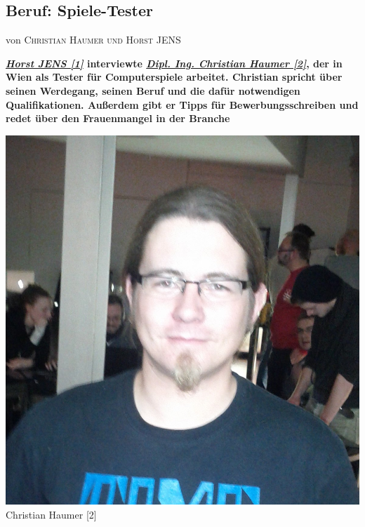 \documentclass[10pt,a4paper,ngerman,twoside]{article} %
\newcommand{\NewsItem}[1]{ %
\usefont{T1}{fvs}{n}{n} %
\vspace{24pt}\large #1\vspace{3pt} %
\par \normalsize \normalfont}
\newcommand{\NewsAuthor}[1]{ %
\hfill von \textsc{#1} \vspace{20pt} %
\par \normalfont}
\begin{document}
\begin{multicols}{3}
\NewsItem{}
\section*{Beruf: Spiele-Tester}
\label{spieletester}
\NewsAuthor{Christian Haumer und Horst JENS}


\textbf{\href{http://spielend-programmieren.at}{\textit{Horst JENS [1]}} interviewte \href{http://www.humepage.at}{\textit{Dipl. Ing. Christian Haumer [2]}}, der in Wien als Tester für Computerspiele  arbeitet. Christian spricht über seinen Werdegang, seinen Beruf und die dafür notwendigen Qualifikationen. Außerdem gibt er Tipps für Bewerbungsschreiben und redet über den Frauenmangel in der Branche}

\begin{center}
\includegraphics[width=0.8\linewidth]{spieletester/spieletester-christian-haumer.jpg}\\
\footnotesize{Christian Haumer [2]}
\end{center}


\end{multicols}
\end{document}
